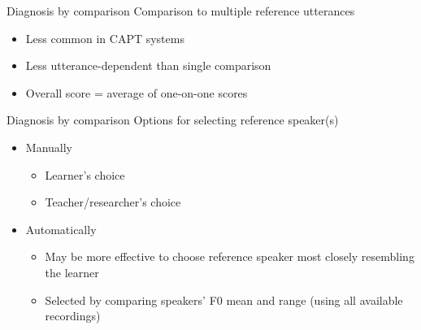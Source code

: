 \documentclass[xcolor={dvipsnames}]{beamer}
\begin{document}
		\begin{frame}{Diagnosis by comparison}
		Comparison to multiple reference utterances
		
		\begin{center}		
		\end{center}
			
		\begin{itemize}
		\item Less common in CAPT systems
		\item Less utterance-dependent than single comparison
		\item Overall score = average of one-on-one scores
		\end{itemize}
		\end{frame}		
		
		\begin{frame}{Diagnosis by comparison}
		Options for selecting reference speaker(s)
		\begin{itemize}
		\item Manually 
			\begin{itemize}
			\item Learner's choice
			\item Teacher/researcher's choice
			\end{itemize}
		\item Automatically 
			\begin{itemize}
			\item May be more effective to choose reference speaker most closely resembling the learner
			\item Selected by comparing speakers' F0 mean and range (using all available recordings)
			\end{itemize}
		\end{itemize}
		
		\end{frame}
		
\end{document}
